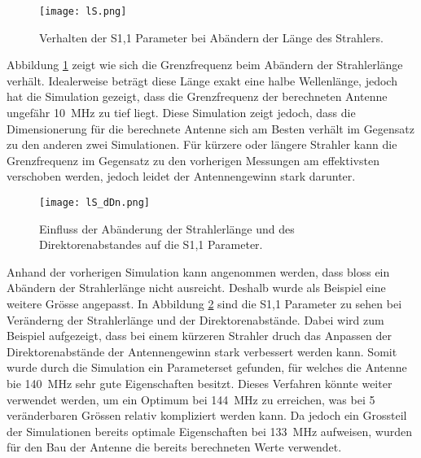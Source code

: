 \begin{figure}[h!]
	\centering
	\texttt{[image: lS.png]}
	\caption{Verhalten der S1,1 Parameter bei Abändern der Länge des Strahlers.}
	\label{fig:Simulation_lS}
\end{figure}

Abbildung \ref{fig:Simulation_lS} zeigt wie sich die Grenzfrequenz beim Abändern der Strahlerlänge verhält. Idealerweise beträgt diese Länge exakt eine halbe Wellenlänge, jedoch hat die Simulation gezeigt, dass die Grenzfrequenz der berechneten Antenne ungefähr \SI{10}{MHz} zu tief liegt. Diese Simulation zeigt jedoch, dass die Dimensionerung für die berechnete Antenne sich am Besten verhält im Gegensatz zu den anderen zwei Simulationen. Für kürzere oder längere Strahler kann die Grenzfrequenz im Gegensatz zu den vorherigen Messungen am effektivsten verschoben werden, jedoch leidet der Antennengewinn stark darunter.

\begin{figure}[h!]
	\centering
	\texttt{[image: lS\_dDn.png]}
	\caption{Einfluss der Abänderung der Strahlerlänge und des Direktorenabstandes auf die S1,1 Parameter.}
	\label{fig:Simulation_lS_dDn}
\end{figure}

Anhand der vorherigen Simulation kann angenommen werden, dass bloss ein Abändern der Strahlerlänge nicht ausreicht. Deshalb wurde als Beispiel eine weitere Grösse angepasst. In Abbildung \ref{fig:Simulation_lS_dDn} sind die S1,1 Parameter zu sehen bei Veränderng der Strahlerlänge und der Direktorenabstände. Dabei wird zum Beispiel aufgezeigt, dass bei einem kürzeren Strahler druch das Anpassen der Direktorenabstände der Antennengewinn stark verbessert werden kann. Somit wurde durch die Simulation ein Parameterset gefunden, für welches die Antenne bie \SI{140}{MHz} sehr gute Eigenschaften besitzt. Dieses Verfahren könnte weiter verwendet werden, um ein Optimum bei \SI{144}{MHz} zu erreichen, was bei 5 veränderbaren Grössen relativ kompliziert werden kann. Da jedoch ein Grossteil der Simulationen bereits optimale Eigenschaften bei \SI{133}{MHz} aufweisen, wurden für den Bau der Antenne die bereits berechneten Werte verwendet.
